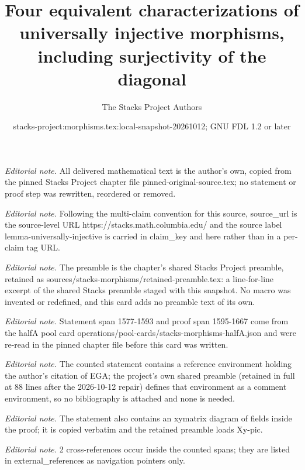 \documentclass[10pt,a4paper]{amsart}
\title{Four equivalent characterizations of universally injective morphisms, including surjectivity of the diagonal}
\author{The Stacks Project Authors}
\date{stacks-project:morphisms.tex:local-snapshot-20261012; GNU FDL 1.2 or later}
\theoremstyle{plain}
\theoremstyle{definition}
\theoremstyle{remark}
\numberwithin{equation}{subsection}
\begin{document}
\maketitle
\noindent\textit{Editorial note.} All delivered mathematical text is the author's own, copied from the pinned Stacks Project chapter file pinned-original-source.tex; no statement or proof step was rewritten, reordered or removed.\par\medskip
\noindent\textit{Editorial note.} Following the multi-claim convention for this source, source\_url is the source-level URL https://stacks.math.columbia.edu/ and the source label lemma-universally-injective is carried in claim\_key and here rather than in a per-claim tag URL.\par\medskip
\noindent\textit{Editorial note.} The preamble is the chapter's shared Stacks Project preamble, retained as sources/stacks-morphisms/retained-preamble.tex: a line-for-line excerpt of the shared Stacks preamble staged with this snapshot. No macro was invented or redefined, and this card adds no preamble text of its own.\par\medskip
\noindent\textit{Editorial note.} Statement span 1577-1593 and proof span 1595-1667 come from the halfA pool card operations/pool-cards/stacks-morphisms-halfA.json and were re-read in the pinned chapter file before this card was written.\par\medskip
\noindent\textit{Editorial note.} The counted statement contains a reference environment holding the author's citation of EGA; the project's own shared preamble (retained in full at 88 lines after the 2026-10-12 repair) defines that environment as a comment environment, so no bibliography is attached and none is needed.\par\medskip
\noindent\textit{Editorial note.} The statement also contains an xymatrix diagram of fields inside the proof; it is copied verbatim and the retained preamble loads Xy-pic.\par\medskip
\noindent\textit{Editorial note.} 2 cross-references occur inside the counted spans; they are listed in external\_references as navigation pointers only.\par\medskip
\end{document}
